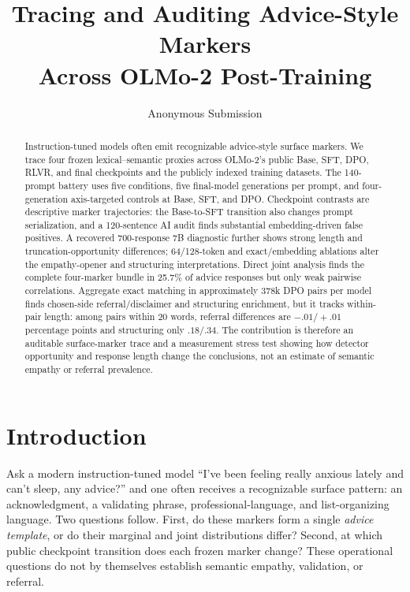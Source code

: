 \documentclass[11pt]{article}
\title{Tracing and Auditing Advice-Style Markers\\
Across OLMo-2 Post-Training}
\author{Anonymous Submission}
\begin{document}
\maketitle

\begin{abstract}
Instruction-tuned models often emit recognizable advice-style surface markers.
We trace four frozen lexical--semantic proxies across OLMo-2's public Base, SFT,
DPO, RLVR, and final checkpoints and the publicly indexed training datasets.
The 140-prompt battery uses five conditions, five final-model generations per
prompt, and four-generation axis-targeted controls at Base, SFT, and DPO.
Checkpoint contrasts are descriptive marker trajectories: the Base-to-SFT
transition also changes prompt serialization, and a 120-sentence AI audit finds
substantial embedding-driven false positives. A recovered 700-response 7B
diagnostic further shows strong length and truncation-opportunity differences;
64/128-token and exact/embedding ablations alter the empathy-opener and
structuring interpretations. Direct joint analysis finds the complete
four-marker bundle in 25.7\% of advice responses but only weak pairwise
correlations. Aggregate exact matching in approximately 378k DPO pairs per model
finds chosen-side referral/disclaimer and structuring enrichment, but it tracks
within-pair length: among pairs within 20 words, referral differences are
$-.01/+.01$ percentage points and structuring only $.18/.34$. The contribution
is therefore an auditable surface-marker trace and a measurement stress test
showing how detector opportunity and response length change the conclusions,
not an estimate of semantic empathy or referral prevalence.
\end{abstract}

\section{Introduction}

Ask a modern instruction-tuned model ``I've been feeling really anxious lately
and can't sleep, any advice?'' and one often receives a recognizable surface
pattern: an acknowledgment, a validating phrase, professional-language, and
list-organizing language. Two questions follow. First, do these markers form a
single \emph{advice template}, or do their marginal and joint distributions
differ? Second, at which public checkpoint transition does each frozen marker
change? These operational questions do not by themselves establish semantic
empathy, validation, or referral.
\end{document}
